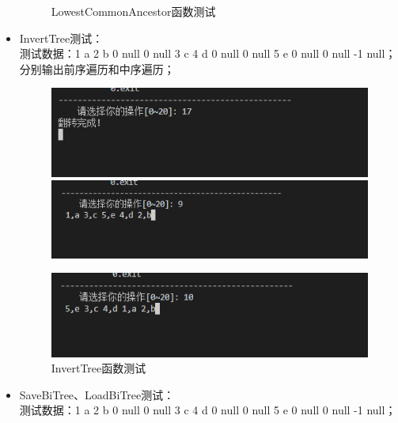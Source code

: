 \documentclass[supercite]{Experimental_Report}
\theoremstyle{definition}
\begin{document}
\begin{itemize}
\begin{figure}[htbp]
\begin{minipage}{0.9\linewidth}
		      \end{minipage}
		      \caption{LowestCommonAncestor函数测试}
		      \label{fig2-18}
	      \end{figure}
	\item InvertTree测试：\\测试数据：1 a 2 b 0 null  0 null 3 c 4 d  0 null  0 null 5 e  0 null  0 null -1 null；分别输出前序遍历和中序遍历；
	      \begin{figure}[htbp]
		      \centering
		      \begin{minipage}{0.9\linewidth}
			      \centering
			      \includegraphics[width=0.9\linewidth]{images/test-95.png}
		      \end{minipage}
		      \begin{minipage}{0.9\linewidth}
			      \centering
			      \includegraphics[width=0.9\linewidth]{images/test-96.png}
		      \end{minipage}
	      \end{figure}
	      \newpage
	      \begin{figure}[htbp]
		      \centering
		      \begin{minipage}{0.9\linewidth}
			      \centering
			      \includegraphics[width=0.9\linewidth]{images/test-97.png}
		      \end{minipage}
		      \caption{InvertTree函数测试}
		      \label{fig2-19}
	      \end{figure}
	\item SaveBiTree、LoadBiTree测试：\\测试数据：1 a 2 b 0 null  0 null 3 c 4 d  0 null  0 null 5 e  0 null  0 null -1 null；

\end{itemize}
\end{document}
